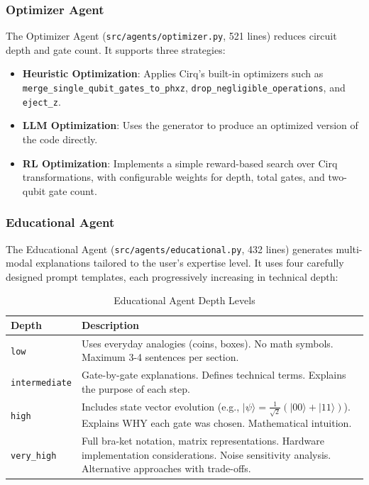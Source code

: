 \documentclass[runningheads]{llncs}
\begin{document}
\subsubsection{Optimizer Agent}
The Optimizer Agent (\texttt{src/agents/optimizer.py}, 521 lines) reduces circuit depth and gate count. It supports three strategies:
\begin{itemize}
    \item \textbf{Heuristic Optimization}: Applies Cirq's built-in optimizers such as \texttt{merge\_\-single\_qubit\_gates\_to\_phxz}, \texttt{drop\_negligible\_operations}, and \texttt{eject\_z}.
    \item \textbf{LLM Optimization}: Uses the generator to produce an optimized version of the code directly.
    \item \textbf{RL Optimization}: Implements a simple reward-based search over Cirq transformations, with configurable weights for depth, total gates, and two-qubit gate count.
\end{itemize}

\subsubsection{Educational Agent}
The Educational Agent (\texttt{src/agents/educational.py}, 432 lines) generates multi-modal explanations tailored to the user's expertise level. It uses four carefully designed prompt templates, each progressively increasing in technical depth:

\begin{table}[H]
\centering
\caption{Educational Agent Depth Levels}
\label{tab:edu_depth}
\begin{tabular}{lp{8cm}}
\toprule
\textbf{Depth} & \textbf{Description} \\
\midrule
\texttt{low} & Uses everyday analogies (coins, boxes). No math symbols. Maximum 3-4 sentences per section. \\
\texttt{intermediate} & Gate-by-gate explanations. Defines technical terms. Explains the purpose of each step. \\
\texttt{high} & Includes state vector evolution (e.g., $|\psi\rangle = \frac{1}{\sqrt{2}}(|00\rangle + |11\rangle)$). Explains WHY each gate was chosen. Mathematical intuition. \\
\texttt{very\_high} & Full bra-ket notation, matrix representations. Hardware implementation considerations. Noise sensitivity analysis. Alternative approaches with trade-offs. \\
\bottomrule
\end{tabular}
\end{table}
\end{document}
